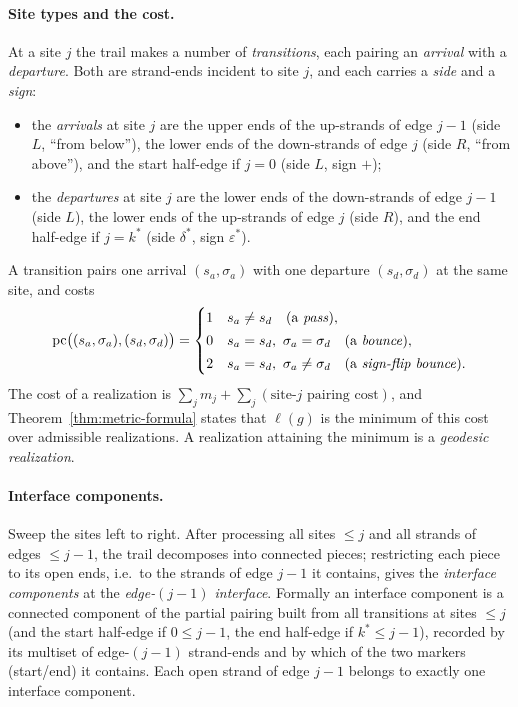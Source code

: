 \paragraph{Site types and the cost.}
At a site $j$ the trail makes a number of \emph{transitions}, each pairing an
\emph{arrival} with a \emph{departure}.  Both are strand-ends incident to
site $j$, and each carries a \emph{side} and a \emph{sign}:

\begin{itemize}\itemsep0.15em
\item the \emph{arrivals} at site $j$ are the upper ends of the up-strands of
edge $j-1$ (side $L$, ``from below''), the lower ends of the down-strands of
edge $j$ (side $R$, ``from above''), and the start half-edge if $j=0$
(side $L$, sign $+$);
\item the \emph{departures} at site $j$ are the lower ends of the
down-strands of edge $j-1$ (side $L$), the lower ends of the up-strands of
edge $j$ (side $R$), and the end half-edge if $j=k^*$
(side $\delta^*$, sign $\varepsilon^*$).
\end{itemize}

A transition pairs one arrival $(s_a,\sigma_a)$ with one departure
$(s_d,\sigma_d)$ at the same site, and costs
\begin{equation}
\label{eq:pcost}
\mathrm{pc}\bigl((s_a,\sigma_a),(s_d,\sigma_d)\bigr)
=\begin{cases}
1 & s_a\neq s_d \quad(\text{a \emph{pass}}),\\[2pt]
0 & s_a=s_d,\ \sigma_a=\sigma_d\quad(\text{a \emph{bounce}}),\\[2pt]
2 & s_a=s_d,\ \sigma_a\neq\sigma_d\quad(\text{a \emph{sign-flip bounce}}).
\end{cases}
\end{equation}
The cost of a realization is $\sum_j m_j+\sum_j(\text{site-$j$ pairing
cost})$, and Theorem~\ref{thm:metric-formula} states that $\ell(g)$ is the
minimum of this cost over admissible realizations.  A realization attaining
the minimum is a \emph{geodesic realization}.

\paragraph{Interface components.}
Sweep the sites left to right.  After processing all sites $\le j$ and all
strands of edges $\le j-1$, the trail decomposes into connected pieces;
restricting each piece to its open ends, i.e.\ to the strands of edge $j-1$
it contains, gives the \emph{interface components} at the
\emph{edge-$(j-1)$ interface}.  Formally an interface component is a
connected component of the partial pairing built from all transitions at
sites $\le j$ (and the start half-edge if $0\le j-1$, the end half-edge if
$k^*\le j-1$), recorded by its multiset of edge-$(j-1)$ strand-ends and by
which of the two markers (start/end) it contains.  Each open strand of edge
$j-1$ belongs to exactly one interface component.

